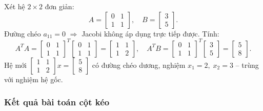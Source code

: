 \documentclass[12pt,a4paper]{article}
\begin{document}
Xét hệ $2\times 2$ đơn giản:
\[
    A = \begin{bmatrix} 0 & 1 \\ 1 & 1 \end{bmatrix},\quad
    B = \begin{bmatrix} 3 \\ 5 \end{bmatrix}.
\]
Đường chéo $a_{11}=0$ $\Rightarrow$ Jacobi không áp dụng trực tiếp được. Tính:
\[
    A^TA = \begin{bmatrix} 0&1\\1&1 \end{bmatrix}^T \begin{bmatrix} 0&1\\1&1 \end{bmatrix}
    = \begin{bmatrix} 1 & 1 \\ 1 & 2 \end{bmatrix},
    \quad
    A^TB = \begin{bmatrix} 0&1\\1&1 \end{bmatrix}^T \begin{bmatrix} 3\\5 \end{bmatrix}
    = \begin{bmatrix} 5 \\ 8 \end{bmatrix}.
\]
Hệ mới $\begin{bmatrix}1&1\\1&2\end{bmatrix}x=\begin{bmatrix}5\\8\end{bmatrix}$ có đường chéo dương, nghiệm $x_1=2,\; x_2=3$ -- trùng với nghiệm hệ gốc.

\subsubsection{Kết quả bài toán cột kéo}
\end{document}
